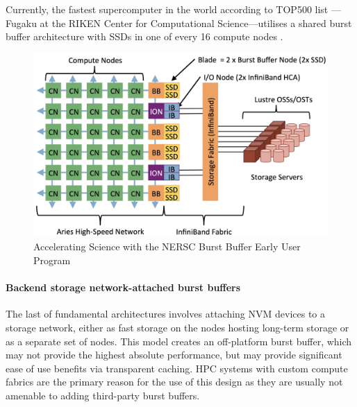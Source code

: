 \documentclass[thesis-en.tex]{subfiles}
\begin{document}
Currently, the fastest supercomputer in the world according to TOP500 list \cite{top500}---Fugaku at the RIKEN Center for Computational Science---utilises a shared burst buffer architecture with SSDs in one of every 16 compute nodes \cite{fugaku}.

\begin{figure}[htb]
    \includegraphics[width=\textwidth]{images/cori-architecture.png}
    {Accelerating Science with the NERSC Burst Buffer Early User Program \cite{bhimji2016accelerating}}
    \label{fig:cori-architecture}
\end{figure}

\paragraph{Backend storage network-attached burst buffers}
The last of fundamental architectures involves attaching NVM devices to a storage network, either as fast storage on the nodes hosting long-term storage or as a separate set of nodes. This model creates an off-platform burst buffer, which may not provide the highest absolute performance, but may provide significant ease of use benefits via transparent caching.  HPC systems with custom compute fabrics are the primary reason for the use of this design as they are usually not amenable to adding third-party burst buffers.
\end{document}
